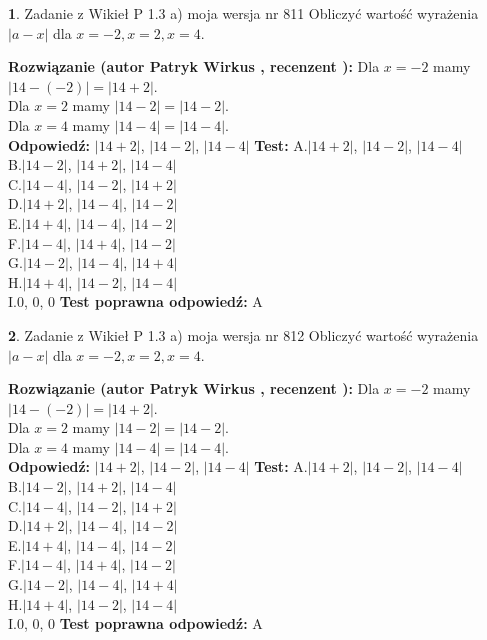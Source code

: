 \documentclass[12pt, a4paper]{article}
\theoremstyle{definition} %
\newtheorem{zad}{}
\newcommand{\zadStart}[1]{\begin{zad}#1\newline}
\newcommand{\zadStop}{\end{zad}}
\newcommand{\rozwStart}[2]{\noindent \textbf{Rozwiązanie (autor #1 , recenzent #2): }\newline}
\newcommand{\rozwStop}{\newline}
\newcommand{\odpStart}{\noindent \textbf{Odpowiedź:}\newline}
\newcommand{\odpStop}{\newline}
\newcommand{\testStart}{\noindent \textbf{Test:}\newline}
\newcommand{\testStop}{\newline}
\newcommand{\kluczStart}{\noindent \textbf{Test poprawna odpowiedź:}\newline}
\newcommand{\kluczStop}{\newline}
\begin{document}
\zadStart{Zadanie z Wikieł P 1.3 a) moja wersja nr 811}
Obliczyć wartość wyrażenia $|a - x|$ dla $x=-2,x=2,x=4$.
\zadStop
\rozwStart{Patryk Wirkus}{}
Dla $x = -2$ mamy $|14 - (-2)| = |14 + 2|$.\\
Dla $x = 2$ mamy $|14 - 2| = |14 - 2|$.\\
Dla $x = 4$ mamy $|14 - 4| = |14 - 4|$.\\
\rozwStop
\odpStart
$|14 + 2|$, $|14 - 2|$, $|14 - 4|$
\odpStop
\testStart
A.$|14 + 2|$, $|14 - 2|$, $|14 - 4|$\\
B.$|14 - 2|$, $|14 + 2|$, $|14 - 4|$\\
C.$|14 - 4|$, $|14 - 2|$, $|14 + 2|$\\
D.$|14 + 2|$, $|14 - 4|$, $|14 - 2|$\\
E.$|14 + 4|$, $|14 - 4|$, $|14 - 2|$\\
F.$|14 - 4|$, $|14 + 4|$, $|14 - 2|$\\
G.$|14 - 2|$, $|14 - 4|$, $|14 + 4|$\\
H.$|14 + 4|$, $|14 - 2|$, $|14 - 4|$\\
I.$0$, $0$, $0$
\testStop
\kluczStart
A
\kluczStop



\zadStart{Zadanie z Wikieł P 1.3 a) moja wersja nr 812}
Obliczyć wartość wyrażenia $|a - x|$ dla $x=-2,x=2,x=4$.
\zadStop
\rozwStart{Patryk Wirkus}{}
Dla $x = -2$ mamy $|14 - (-2)| = |14 + 2|$.\\
Dla $x = 2$ mamy $|14 - 2| = |14 - 2|$.\\
Dla $x = 4$ mamy $|14 - 4| = |14 - 4|$.\\
\rozwStop
\odpStart
$|14 + 2|$, $|14 - 2|$, $|14 - 4|$
\odpStop
\testStart
A.$|14 + 2|$, $|14 - 2|$, $|14 - 4|$\\
B.$|14 - 2|$, $|14 + 2|$, $|14 - 4|$\\
C.$|14 - 4|$, $|14 - 2|$, $|14 + 2|$\\
D.$|14 + 2|$, $|14 - 4|$, $|14 - 2|$\\
E.$|14 + 4|$, $|14 - 4|$, $|14 - 2|$\\
F.$|14 - 4|$, $|14 + 4|$, $|14 - 2|$\\
G.$|14 - 2|$, $|14 - 4|$, $|14 + 4|$\\
H.$|14 + 4|$, $|14 - 2|$, $|14 - 4|$\\
I.$0$, $0$, $0$
\testStop
\kluczStart
A
\kluczStop
\end{document}
